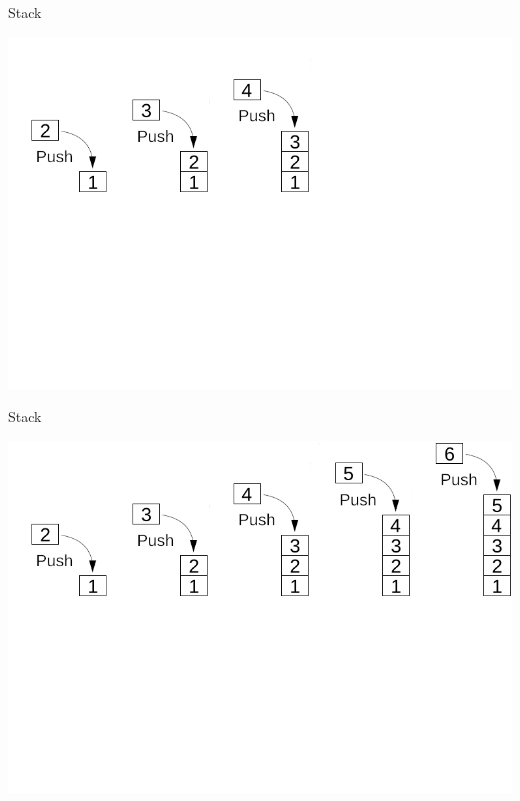 \documentclass[aspectratio=169]{beamer}
\begin{document}
\begin{frame}{Stack}
    \begin{center}
        \includegraphics[scale=0.4625]{images/stack/Stack_3.png}
    \end{center}
\end{frame}

\begin{frame}{Stack}
    \begin{center}
        \includegraphics[scale=0.4625]{images/stack/Stack_4.png}
    \end{center}
\end{frame}
\end{document}

